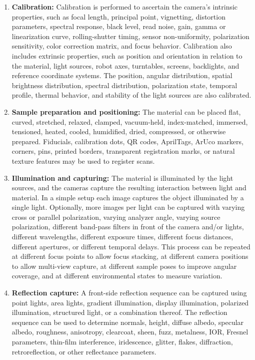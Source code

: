 \documentclass[11pt, twoside, listof=totocnumbered, bibliography=totocnumbered]{scrartcl}
\begin{document}
	\begin{enumerate}
		\item \textbf{Calibration:} Calibration is performed to ascertain the camera's intrinsic properties, such as focal length, principal point, vignetting, distortion parameters, spectral response, black level, read noise, gain, gamma or linearization curve, rolling-shutter timing, sensor non-uniformity, polarization sensitivity, color correction matrix, and focus behavior. Calibration also includes extrinsic properties, such as position and orientation in relation to the material, light sources, robot axes, turntables, screens, backlights, and reference coordinate systems. The position, angular distribution, spatial brightness distribution, spectral distribution, polarization state, temporal profile, thermal behavior, and stability of the light sources are also calibrated.
		
		\item \textbf{Sample preparation and positioning:} The material can be placed flat, curved, stretched, relaxed, clamped, vacuum-held, index-matched, immersed, tensioned, heated, cooled, humidified, dried, compressed, or otherwise prepared. Fiducials, calibration dots, QR codes, AprilTags, ArUco markers, corners, pins, printed borders, transparent registration marks, or natural texture features may be used to register scans.
		
		\item \textbf{Illumination and capturing:} The material is illuminated by the light sources, and the cameras capture the resulting interaction between light and material. In a simple setup each image captures the object illuminated by a single light. Optionally, more images per light can be captured with varying cross or parallel polarization, varying analyzer angle, varying source polarization, different band-pass filters in front of the camera and/or lights, different wavelengths, different exposure times, different focus distances, different apertures, or different temporal delays. This process can be repeated at different focus points to allow focus stacking, at different camera positions to allow multi-view capture, at different sample poses to improve angular coverage, and at different environmental states to measure variation.
		
		\item \textbf{Reflection capture:} A front-side reflection sequence can be captured using point lights, area lights, gradient illumination, display illumination, polarized illumination, structured light, or a combination thereof. The reflection sequence can be used to determine normals, height, diffuse albedo, specular albedo, roughness, anisotropy, clearcoat, sheen, fuzz, metalness, IOR, Fresnel parameters, thin-film interference, iridescence, glitter, flakes, diffraction, retroreflection, or other reflectance parameters.
		

\end{enumerate}
\end{document}
